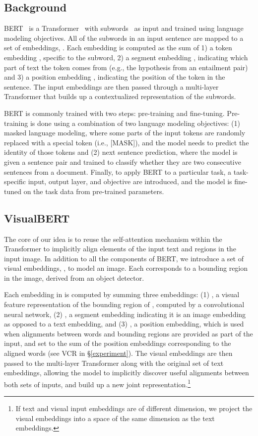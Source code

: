 \documentclass{article} \usepackage{iclr2019_conference,times}
\begin{document}
\subsection{Background}
\label{subsec:background}
BERT~\citep{devlin2018bert} is a Transformer~\citep{vaswani2017attention} with subwords~\citep{wu2016google} as input and trained using language modeling objectives.
All of the subwords in an input sentence are mapped to a set of embeddings, . Each embedding  is computed as the sum of 1) a token embedding , specific to the subword, 2) a segment embedding , indicating which part of text the token comes from (e.g., the hypothesis from an entailment pair) and 3) a position embedding , indicating the position of the token in the sentence.
The input embeddings  are then passed through a multi-layer Transformer that builds up a contextualized representation of the subwords.

BERT is commonly trained with two steps: pre-training and fine-tuning.
Pre-training is done using a combination of two language modeling objectives: (1) masked language modeling, where some parts of the input tokens are randomly replaced with a special token (i.e., [MASK]), and the model needs to predict the identity of those tokens and (2) next sentence prediction, where the model is given a sentence pair and trained to classify whether they are two consecutive sentences from a document.
Finally, to apply BERT to a particular task, a task-specific input, output layer, and objective are introduced, and the model is fine-tuned on the task data from pre-trained parameters.

\subsection{VisualBERT}
\label{subsec:model}
\label{model}

The core of our idea is to reuse the self-attention mechanism within the Transformer to implicitly align elements of the input text and regions in the input image.
In addition to all the components of BERT, we introduce a set of visual embeddings, , to model an image.
Each  corresponds to a bounding region in the image, derived from an object detector.

Each embedding in  is computed by summing three embeddings: (1) , a visual feature representation of the bounding region of , computed by a convolutional neural network, (2) , a segment embedding indicating it is an image embedding as opposed to a text embedding, and (3) , a position embedding, which is used when alignments between words and bounding regions are provided as part of the input, and set to the sum of the position embeddings corresponding to the aligned words (see VCR in \S \ref{experiment}). 
The visual embeddings are then passed to the multi-layer Transformer along with the original set of text embeddings, allowing the model to implicitly discover useful alignments between both sets of inputs, and build up a new joint representation.\footnote{If text and visual input embeddings are of different dimension, we project the visual embeddings into a space of the same dimension as the text embeddings.}
\end{document}
